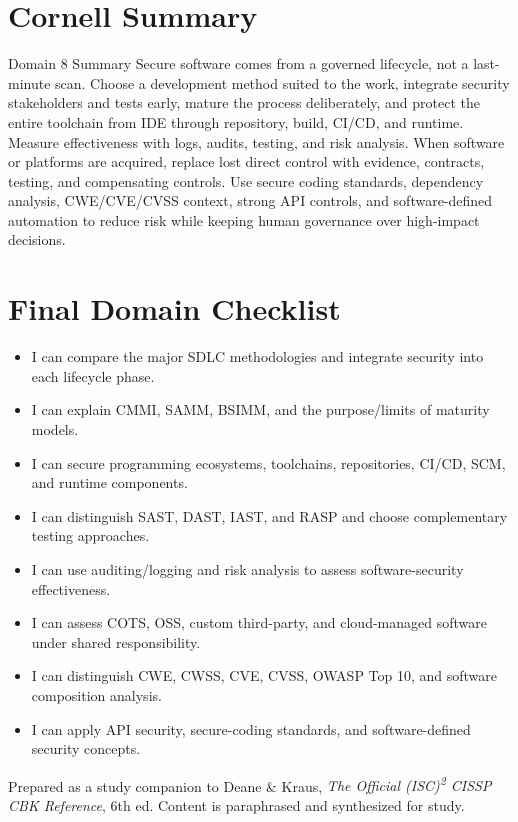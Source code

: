 \documentclass[10pt,letterpaper]{article}
\begin{document}
\section{Cornell Summary}
\begin{summarybox}{Domain 8 Summary}
Secure software comes from a governed lifecycle, not a last-minute scan. Choose a development method suited to the work, integrate security stakeholders and tests early, mature the process deliberately, and protect the entire toolchain from IDE through repository, build, CI/CD, and runtime. Measure effectiveness with logs, audits, testing, and risk analysis. When software or platforms are acquired, replace lost direct control with evidence, contracts, testing, and compensating controls. Use secure coding standards, dependency analysis, CWE/CVE/CVSS context, strong API controls, and software-defined automation to reduce risk while keeping human governance over high-impact decisions.
\end{summarybox}

\section{Final Domain Checklist}
{\small
\begin{itemize}[label=\(\square\),nosep]
\item I can compare the major SDLC methodologies and integrate security into each lifecycle phase.
\item I can explain CMMI, SAMM, BSIMM, and the purpose/limits of maturity models.
\item I can secure programming ecosystems, toolchains, repositories, CI/CD, SCM, and runtime components.
\item I can distinguish SAST, DAST, IAST, and RASP and choose complementary testing approaches.
\item I can use auditing/logging and risk analysis to assess software-security effectiveness.
\item I can assess COTS, OSS, custom third-party, and cloud-managed software under shared responsibility.
\item I can distinguish CWE, CWSS, CVE, CVSS, OWASP Top 10, and software composition analysis.
\item I can apply API security, secure-coding standards, and software-defined security concepts.
\end{itemize}
}
\vfill{\footnotesize\color{Teal}Prepared as a study companion to Deane \& Kraus, \textit{The Official (ISC)\textsuperscript{2} CISSP CBK Reference}, 6th ed. Content is paraphrased and synthesized for study.}
\end{document}
